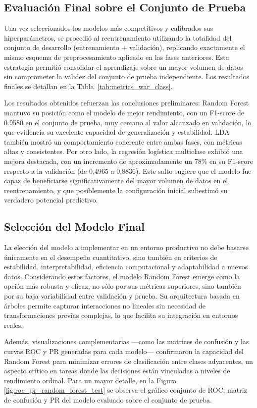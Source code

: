 \begin{multicols}{2}
\subsection{Evaluación Final sobre el Conjunto de Prueba}

Una vez seleccionados los modelos más competitivos y calibrados sus hiperparámetros, se procedió al reentrenamiento utilizando la totalidad del conjunto de desarrollo (entrenamiento + validación), replicando exactamente el mismo esquema de preprocesamiento aplicado en las fases anteriores. Esta estrategia permitió consolidar el aprendizaje sobre un mayor volumen de datos sin comprometer la validez del conjunto de prueba independiente. Los resultados finales se detallan en la Tabla~\ref{tab:metrics_war_class}.

Los resultados obtenidos refuerzan las conclusiones preliminares: Random Forest mantuvo su posición como el modelo de mejor rendimiento, con un F1-score de 0.9580 en el conjunto de prueba, muy cercano al valor alcanzado en validación, lo que evidencia su excelente capacidad de generalización y estabilidad. LDA también mostró un comportamiento coherente entre ambas fases, con métricas altas y consistentes. Por otro lado, la regresión logística multiclase exhibió una mejora destacada, con un incremento de aproximadamente un 78\% en su F1-score respecto a la validación (de 0,4965 a 0,8836). Este salto sugiere que el modelo fue capaz de beneficiarse significativamente del mayor volumen de datos en el reentrenamiento, y que posiblemente la configuración inicial subestimó su verdadero potencial predictivo.
\subsection{Selección del Modelo Final }

La elección del modelo a implementar en un entorno productivo no debe basarse únicamente en el desempeño cuantitativo, sino también en criterios de estabilidad, interpretabilidad, eficiencia computacional y adaptabilidad a nuevos datos. Considerando estos factores, el modelo Random Forest emerge como la opción más robusta y eficaz, no sólo por sus métricas superiores, sino también por su baja variabilidad entre validación y prueba. Su arquitectura basada en árboles permite capturar interacciones no lineales sin necesidad de transformaciones previas complejas, lo que facilita su integración en entornos reales.

Además, visualizaciones complementarias —como las matrices de confusión y las curvas ROC y PR generadas para cada modelo— confirmaron la capacidad del Random Forest para minimizar errores de clasificación entre clases adyacentes, un aspecto crítico en tareas donde las decisiones están vinculadas a niveles de rendimiento ordinal. Para un mayor detalle, en la Figura \ref{fig:roc_pr_random_forest_test} se observa el gráfico conjunto de ROC, matriz de confusión y PR del modelo evaluado sobre el conjunto de prueba. 


\end{multicols}

